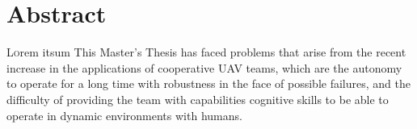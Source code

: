 \chapter*{Abstract}
\pagestyle{especial}
{}
\lettrine[lraise=-0.1, lines=2, loversize=0.2]{L}{o}rem itsum
This Master's Thesis has faced problems that arise from the recent increase in the applications of cooperative UAV teams, which are the autonomy to operate for a long time with robustness in the face of possible failures, and the difficulty of providing the team with capabilities cognitive skills to be able to operate in dynamic environments with humans. 



